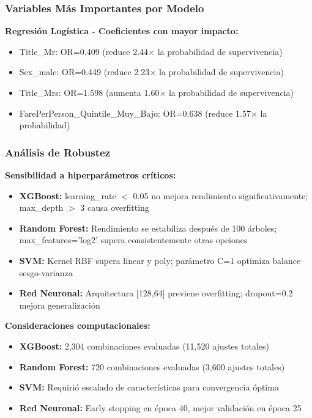 \documentclass[conference]{IEEEtran}
\begin{document}
\subsubsection{Variables Más Importantes por Modelo}

\textbf{Regresión Logística - Coeficientes con mayor impacto:}
\begin{itemize}
    \item Title\_Mr: OR=0.409 (reduce 2.44$\times$ la probabilidad de supervivencia)
    \item Sex\_male: OR=0.449 (reduce 2.23$\times$ la probabilidad de supervivencia)
    \item Title\_Mrs: OR=1.598 (aumenta 1.60$\times$ la probabilidad de supervivencia)
    \item FarePerPerson\_Quintile\_Muy\_Bajo: OR=0.638 (reduce 1.57$\times$ la probabilidad)
\end{itemize}

\subsubsection{Análisis de Robustez}

\textbf{Sensibilidad a hiperparámetros críticos:}
\begin{itemize}
    \item \textbf{XGBoost:} learning\_rate $<$ 0.05 no mejora rendimiento significativamente; max\_depth $>$ 3 causa overfitting
    \item \textbf{Random Forest:} Rendimiento se estabiliza después de 100 árboles; max\_features='log2' supera consistentemente otras opciones
    \item \textbf{SVM:} Kernel RBF supera linear y poly; parámetro C=1 optimiza balance sesgo-varianza
    \item \textbf{Red Neuronal:} Arquitectura [128,64] previene overfitting; dropout=0.2 mejora generalización
\end{itemize}

\textbf{Consideraciones computacionales:}
\begin{itemize}
    \item \textbf{XGBoost:} 2,304 combinaciones evaluadas (11,520 ajustes totales)
    \item \textbf{Random Forest:} 720 combinaciones evaluadas (3,600 ajustes totales)  
    \item \textbf{SVM:} Requirió escalado de características para convergencia óptima
    \item \textbf{Red Neuronal:} Early stopping en época 40, mejor validación en época 25
\end{itemize}
\end{document}
